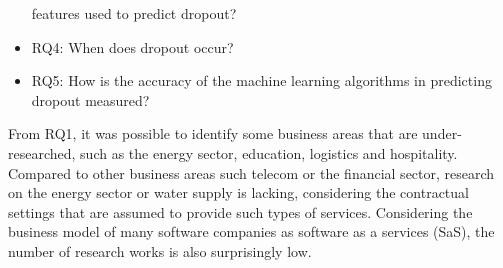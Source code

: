\documentclass[
  12pt,
]{article}
\begin{document}
\begin{itemize}
 features used to predict dropout?
    \item RQ4: When does dropout occur?
    \item RQ5: How is the accuracy of the machine learning algorithms in predicting dropout measured?
\end{itemize}

From RQ1, it was possible to identify some business areas that are
under-researched, such as the energy sector, education, logistics and
hospitality. Compared to other business areas such telecom or the financial
sector, research on the energy sector or water supply is lacking, considering
the contractual settings that are assumed to provide such types of services.
Considering the business model of many software companies as software as a
services (SaS), the number of research works is also surprisingly low.
\end{document}
